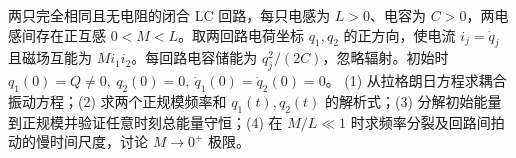 两只完全相同且无电阻的闭合 LC 回路，每只电感为 \(L>0\)、电容为 \(C>0\)，两电感间存在正互感 \(0<M<L\)。取两回路电荷坐标 \(q_1,q_2\) 的正方向，使电流 \(i_j=\dot q_j\) 且磁场互能为 \(M i_1i_2\)。每回路电容储能为 \(q_j^2/(2C)\)，忽略辐射。初始时 \(q_1(0)=Q\ne0,\ q_2(0)=0,\ \dot q_1(0)=\dot q_2(0)=0\)。
(1) 从拉格朗日方程求耦合振动方程；(2) 求两个正规模频率和 \(q_1(t),q_2(t)\) 的解析式；(3) 分解初始能量到正规模并验证任意时刻总能量守恒；(4) 在 \(M/L\ll1\) 时求频率分裂及回路间拍动的慢时间尺度，讨论 \(M\to0^+\) 极限。
